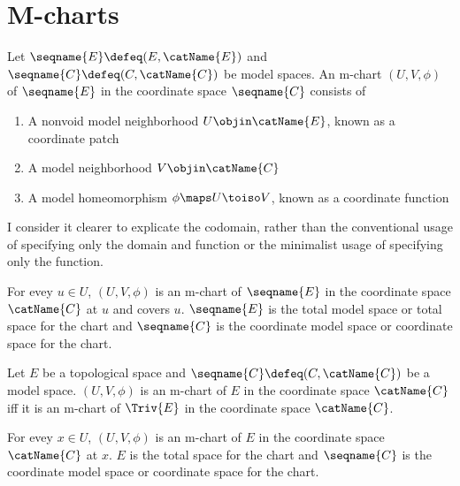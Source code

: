 \documentclass{article}
\begin{document}
\section{M-charts}
{
  \showlabelsinline
  \label{sec:M-charts}
}
\begin{definition}[M-charts]
\label{def:M-chart}
Let $\seqname{E} \defeq (E, \catName{E})$ and
$\seqname{C} \defeq (C,\catName{C})$ be model spaces. An m-chart
$(U, V, \phi)$ of $\seqname{E}$ in the coordinate space $\seqname{C}$
consists of
\begin{enumerate}
\item A nonvoid model neighborhood $U \objin \catName{E}$, known as a
coordinate patch
\item A model neighborhood $V\objin \catName{C}$
\item A model homeomorphism $\phi \maps U \toiso V$, known as a
coordinate function
\end{enumerate}
\begin{remark}
I consider it clearer to explicate the codomain, rather than the
conventional usage of specifying only the domain and function or the
minimalist usage of specifying only the function.
\end{remark}
For evey $u \in U$, $(U, V, \phi)$ is an m-chart of $\seqname{E}$ in the
coordinate space $\catName{C}$ at $u$ and covers $u$.
$\seqname{E}$ is the total model space or total space for the chart and
$\seqname{C}$ is the coordinate model space or coordinate space for the
chart.

Let $E$ be a topological space and $\seqname{C} \defeq (C,\catName{C})$
be a model space. $(U, V, \phi)$ is an m-chart of $E$ in the coordinate
space $\catName{C}$ iff it is an m-chart of $\Triv{E}$ in the coordinate
space $\catName{C}$.

For evey $x \in U$, $(U, V, \phi)$ is an m-chart of $E$ in the
coordinate space $\catName{C}$ at $x$.
$E$ is the total space for the chart and $\seqname{C}$ is the coordinate
model space or coordinate space for the chart.
\end{definition}
\end{document}
